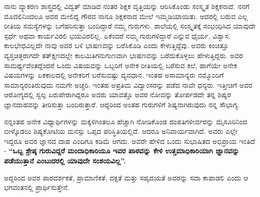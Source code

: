ನಾನು ವ್ಯಾಕರಣ ಶಾಸ್ತ್ರದಲ್ಲಿ ವಿದ್ವತ್ ಮಾಡಿದ ನಂತರ ಶಿಕ್ಷಕ ವೃತ್ತಿಯನ್ನು ಆರಿಸಿಕೊಂಡು ಸಂಸ್ಕೃತ ಶಿಕ್ಷಕನಾದೆ. ನನಗೆ ಮೊದಲಿನಿಂದಲೂ ಅವರ ಮೇಲಿದ್ದ ಗೌರವ ನಾನೂ ಶಿಕ್ಷಕನಾದ ಮೇಲೆ ಇಮ್ಮಡಿಯಾಯಿತು. ಅದರಲ್ಲಿ ಬರುವ ಎಲ್ಲ ರೀತಿಯ ಸಮಸ್ಯೆಗಳನ್ನು ಬಗೆಹರಿಸುತ್ತಾ ಬಂದಿದ್ದಾರೆ ನಮ್ಮ ಗುರುಗಳು. ಶಾಲೆಯಲ್ಲಿ ಸಂಸ್ಕೃತಕ್ಕೆ ಸಂಭಂಧಿಸಿದ ಯಾವುದೇ ಸ್ಪರ್ಧೆ ಅಥವಾ ಕಾರ್ಯವಿರಲಿ ಭಯವಿರಲಿಲ್ಲ. ಏಕೆಂದರೆ ನಮ್ಮ ಗುರುಗಳಿದ್ದಾರೆ ಎನ್ನುವ ಧೈರ್ಯ, ವಿಶ್ವಾಸ. ಕಾಲಭೇಧವಿಲ್ಲದೇ ನಾವು ಅವರ ಬಳಿ ಭಾಷಣವನ್ನು ಬರೆಸಿಕೊಡಿ ಎಂದು ಕೇಳುತ್ತಿದ್ದೆವು. ಅವರು ಕಿಂಚಿತ್ತೂ ವ್ಯಸ್ತಚಿತ್ತರಾಗದೇ ತತ್ಕ್ಷಣದಲ್ಲೇ ಕಾಲಮಿತಿಗನುಗುಣವಾಗಿ ಭಾಷಣವನ್ನು ಬರೆದುಕೊಳ್ಳಲು ಹೇಳುತ್ತಿದ್ದರು. ಅವರ ಸಾಮರ್ಥ್ಯವೆಂತದ್ದೆಂದರೆ ಒಂದು ವಿಷಯವನ್ನು ಒಬ್ಬರಿಗೆ ಅನೇಕ ರೀತಿಯಲ್ಲಿ ಬರೆಸುವ ಕಲೆ, ಹಾಗೆಯೇ ಅನೇಕ ವಿಷಯಗಳನ್ನು ಏಕಕಾಲದಲ್ಲಿ ಅನೇಕರಿಗೆ ಬರೆಸುವಷ್ಟು ವ್ಯವಧಾನ. ಇಂತಹ ಅಸಾಮಾನ್ಯರು ನಮ್ಮೊಂದಿಗೆ ಸಾಮಾನ್ಯರಂತಿರುವುದು ನಮಗೇ ಅಚ್ಚರಿ. ಇಂತಹ ಅಪ್ರತಿಮ ವಿದ್ವಾಂಸರನ್ನು ಪಡೆದ ನಾವೇ ಧನ್ಯರು. ಇತ್ತೀಚಿಗೆ ಅವರ ಆರೋಗ್ಯದಲ್ಲಿ ಸ್ವಲ್ಪ ಏರುಪೇರಾಗಿದ್ದರೂ ಅವರು ಯಾವತ್ತೊ ಅವರ ನೋವನ್ನು ತೋರ್ಪಡದೇ ತನ್ನ ಶಿಷ್ಯರ ಜ್ಞಾನದಾಹವನ್ನು ತೀರಿಸುತ್ತಾ ಬಂದಿರುತ್ತಾರೆ. ಆದ್ದರಿಂದ ಅಂತಹ ಗುರುಗಳಿಗೆ ಶಿಷ್ಯನಾಗಿರುವುದು ನನ್ನ ಸೌಭಾಗ್ಯ.
	
ನನ್ನಂತಹ ಅನೇಕ ವಿಧ್ಯಾರ್ಥಿಗಳನ್ನು ಮಕ್ಕಳಿಗಿಂತಲೂ ಹೆಚ್ಚಾಗಿ ನೋಡಿಕೊಂಡ ದಂಪತಿಗಳೀರ್ವರನ್ನು ಮೈಸೂರಿನಿಂದ ಬೀಳ್ಕೊಡಲು ಶಿಷ್ಯಕೋಟಿಯ ಮನಸ್ಸು ಒಪ್ಪದ ಪರಿಸ್ಥಿತಿಯಲ್ಲಿದೆ. ಆದರೂ ಅನಿವಾರ್ಯವಾಗಿದೆ. ಅವರು ಎಲ್ಲೇ ಇದ್ದರೂ ಅವರ ಜ್ಞಾನದ ದಾಹ ಎಂದಿಗೂ ಕಡಿಮೆ ಆಗದು. ಅವರೇ ಹೇಳಿದ ಒಂದು ಸುಭಾಷಿತದ ಅಭಿಪ್ರಾಯ ಇಂತಿದೆ - \textbf{“ಒಬ್ಬ ಶ್ರೇಷ್ಠ ಗುರುವಿದ್ದರೆ ಮಂದಾಧಿಕಾರಿಯೂ ಇವರ ಪಾಠವನ್ನು ಕೇಳಿ ಉತ್ತಮಾಧಿಕಾರಿಯಾಗಿ ಜ್ಞಾನವನ್ನು ಪಡೆಯುತ್ತಾನೆ ಎಂಬುದರಲ್ಲಿ ಯಾವುದೇ ಸಂಶಯವಿಲ್ಲ”.}

ಅದ್ದರಿಂದ ಅವರ ಪಾರದರ್ಶಕತೆ, ಪ್ರಾಮಾಣಿಕತೆ, ದಕ್ಷತೆ ಮತ್ತು ಸಹೃದಯತೆ ಅವರನ್ನು ಸದಾ ಕಾಪಾಡಲಿ ಎಂದು ಆ ಭಗವಂತನಲ್ಲಿ ಪ್ರಾರ್ಥಿಸುತ್ತೇನೆ.
